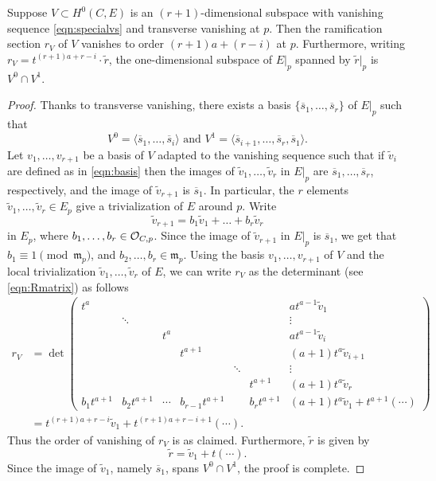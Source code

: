 \begin{proposition}\label{prop:agreement}
  Suppose $V \subset H^0(C, E)$ is an $(r+1)$-dimensional subspace with vanishing sequence \eqref{eqn:specialvs} and transverse vanishing at $p$.
  Then the ramification section $r_V$ of $V$ vanishes to order $(r+1)a + (r-i)$ at $p$.
  Furthermore, writing $r_V = t^{(r+1)a+r-i} \cdot \widetilde r$, the one-dimensional subspace of $E|_p$ spanned by $\widetilde r|_p$ is $V^0 \cap V^1$.
\end{proposition}
\begin{proof}
  Thanks to transverse vanishing, there exists a basis $\{\overline s_1, \dots, \overline s_{r} \}$ of $E|_p$ such that
  \[ V^0 = \langle  \overline s_1, \dots, \overline s_i \rangle \text{ and } V^1 = \langle  \overline s_{i+1}, \dots, \overline s_r, \overline s_1 \rangle.\]
  Let $v_1, \dots, v_{r+1}$ be a basis of $V$ adapted to the vanishing sequence such that if $\widetilde v_i$ are defined as in \eqref{eqn:basis} then the images of $\widetilde v_1, \dots, \widetilde v_r$ in $E|_p$ are $\overline s_1, \dots, \overline s_r$, respectively, and the image of $\widetilde v_{r+1}$ is $\overline s_1$.
  In particular, the $r$ elements $\widetilde v_1, \dots, \widetilde v_r \in E_p$ give a trivialization of $E$ around $p$.
  Write
  \[ \widetilde v_{r+1} = b_1 \widetilde v_1 + \dots + b_r \widetilde v_r\]
  in $E_p$, where $b_1, \dots, b_r \in \mathcal O_{C,p}$.
  Since the image of $\widetilde v_{r+1}$ in $E|_p$ is $\overline s_1$, we get that $b_1 \equiv 1 \pmod {\mathfrak m_p}$, and $b_2, \dots, b_r \in \mathfrak m_p$.  
  Using the basis $v_1, \dots, v_{r+1}$ of $V$ and the local trivialization $\widetilde v_1, \dots, \widetilde v_r$ of $E$, we can write $r_V$ as the determinant (see \eqref{eqn:Rmatrix}) as follows
  \begin{align*}
    r_V &= \det
    \begin{pmatrix}
      t^a & & & & & &  at^{a-1}\widetilde v_1\\
       & \ddots & & & & &\vdots\\
       & & t^a  & & & &a t^{a-1}\widetilde v_i\\
       & & & t^{a+1}  & & &(a+1)t^a \widetilde v_{i+1} \\
       & & & & \ddots & & \vdots\\
       & & & & &t^{a+1} &(a+1)t^{a}\widetilde v_r\\
      b_1t^{a+1}& b_2 t^{a+1} & \cdots & b_{r-1}t^{a+1} & & b_rt^{a+1} & (a+1)t^a\widetilde v_1 + t^{a+1}(\cdots)
    \end{pmatrix}\\
        &= t^{(r+1)a+r-i} \widetilde v_1  + t^{(r+1)a+r-i+1} (\cdots).
  \end{align*}
  Thus the order of vanishing of $r_V$ is as claimed.
  Furthermore, $\widetilde r$ is given by
  \[ \widetilde r = \widetilde v_1 + t (\cdots).\]
  Since the image of $\widetilde v_1$, namely $\overline s_1$, spans $V^0 \cap V^1$, the proof is complete.
\end{proof}

